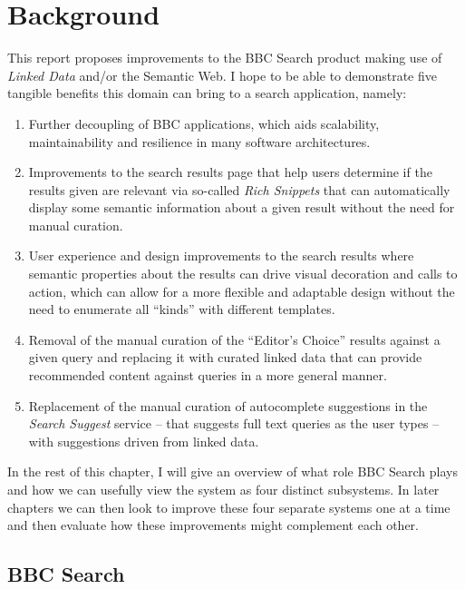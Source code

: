 \chapter{Background}
\label{intro}

This report proposes improvements to the BBC Search product making use
of \emph{Linked Data}\cite{bizer2009linked} and/or the Semantic
Web\cite{berners2001semantic}. I hope to be able to demonstrate five tangible
benefits this domain can bring to a search application, namely:

\begin{enumerate}
  \item Further decoupling of BBC applications, which aids scalability,
    maintainability and resilience in many software architectures.\cite{}
  \item Improvements to the search results page that help users determine
    if the results given are relevant via so-called
    \emph{Rich Snippets}\cite{goel2009introducing}
    that can automatically display some semantic information about a given
    result without the need for manual curation.
  \item User experience and design improvements to the search results
    where semantic properties about the results can drive visual decoration
    and calls to action, which can allow for a more flexible and
    adaptable design without the need to enumerate all ``kinds'' with
    different templates.
  \item Removal of the manual curation of the ``Editor's Choice'' results
    against a given query and replacing it with curated linked data that
    can provide recommended content against queries in a more general
    manner.
  \item Replacement of the manual curation of autocomplete suggestions
    in the \emph{Search Suggest} service -- that suggests full text queries
    as the user types -- with suggestions driven from linked data.
\end{enumerate}

In the rest of this chapter, I will give an overview of what role BBC
Search plays and how we can usefully view the system as four
distinct subsystems. In later chapters we can then look to improve these
four separate systems one at a time and then evaluate how these improvements
might complement each other.

\section{BBC Search}

